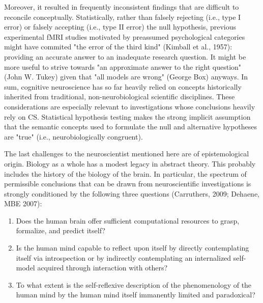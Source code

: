 \documentclass[authoryear,review,3p]{elsarticle}
\begin{document}
Moreover, it resulted in frequently inconsistent findings
that are difficult to reconcile conceptually.
%
Statistically, rather than falsely rejecting (i.e., type I error) or
falsely accepting (i.e., type II error) the null hypothesis,
previous experimental fMRI studies motivated by
preassumed psychological categories might have commited
"the error of the third kind" (Kimball et al., 1957):
providing an accurate answer to an inadequate research question.
It might be more useful to
strive towards "an approximate answer to the right question"
(John W. Tukey) given that "all models are wrong" (George Box) anyways.
%
In sum,
cognitive neuroscience has so far heavily relied on concepts
historically inherited from traditional,
non-neurobiological scientific disciplines.
These considerations are especially relevant to investigations
whose conclusions heavily rely on CS.
Statistical hypothesis testing makes the
strong implicit assumption that
the semantic concepts used to formulate 
the null and alternative hypotheses are "true"
(i.e., neurobiologically congruent).


The last challenges to the neuroscientist
mentioned here are of epistemological origin.
Biology as a whole has a modest legacy in abstract theory.
This probably includes the history of the biology of the brain.
In particular,
the spectrum of permissible conclusions
that can be drawn from neuroscientific investigations is strongly conditioned
by the following three questions
(Carruthers, 2009; Dehaene, MBE 2007):
\begin{enumerate}
  \item Does the human brain offer sufficient computational resources
  to grasp, formalize, and predict itself?
  \item Is the human mind capable to reflect upon itself
by directly contemplating itself via introspection or by
indirectly contemplating an internalized self-model acquired through
interaction with others?
  \item To what extent is the self-reflexive description of the phenomenology of
  the human mind by the human mind itself immanently
  limited and paradoxical?
\end{enumerate}
\end{document}

